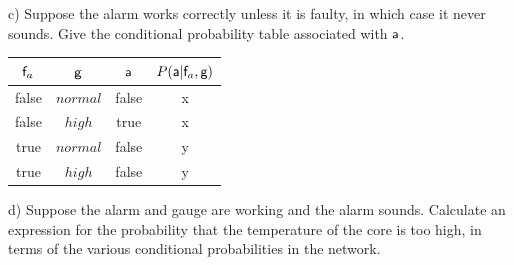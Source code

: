 \documentclass[a4paper,footsepline]{scrartcl}
\begin{document}
c) Suppose the alarm works correctly unless it is faulty, in which case it
  never sounds. Give the conditional probability table associated with
  $\rv{a}$.
  
  	\vspace{0.5cm}
  	\begin{tabular}{|c|c|c|c|}\hline
		$\rv{f}_a$ & $\rv{g}$   &  $\rv{a}$ & $P(\rv{a}|\rv{f}_a,\rv{g})$ \\\hline
		false      & $normal$   &  false    & x \\\hline
		false      & $high$     &  true     & x \\\hline
		true       & $normal$   &  false    & y \\\hline
		true       & $high$     &  false    & y \\\hline
	\end{tabular}
	\vspace{0.5cm}

d) Suppose the alarm and gauge are working and the alarm sounds. Calculate
  an expression for the probability that the temperature of the core is too
  high, in terms of the various conditional probabilities in the network.


	
\end{document}

